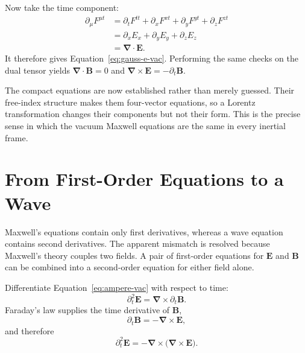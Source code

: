 Now take the time component:
\begin{align}
\partial_\mu F^{\mu t}
&=\partial_tF^{tt}
  +\partial_xF^{xt}
  +\partial_yF^{yt}
  +\partial_zF^{zt}\\
&=\partial_xE_x+\partial_yE_y+\partial_zE_z\\
&=\boldsymbol\nabla\cdot\mathbf E.
\end{align}
It therefore gives Equation~\eqref{eq:gauss-e-vac}. Performing the same checks on the dual tensor yields
\(\boldsymbol\nabla\cdot\mathbf B=0\) and
\(\boldsymbol\nabla\times\mathbf E=-\partial_t\mathbf B\).

The compact equations are now established rather than merely guessed. Their free-index structure makes them four-vector equations, so a Lorentz transformation changes their components but not their form. This is the precise sense in which the vacuum Maxwell equations are the same in every inertial frame.

\section{From First-Order Equations to a Wave}

Maxwell's equations contain only first derivatives, whereas a wave equation contains second derivatives. The apparent mismatch is resolved because Maxwell's theory couples two fields. A pair of first-order equations for \(\mathbf E\) and \(\mathbf B\) can be combined into a second-order equation for either field alone.

Differentiate Equation~\eqref{eq:ampere-vac} with respect to time:
\begin{equation}
\partial_t^2\mathbf E
=\boldsymbol\nabla\times\partial_t\mathbf B.
\end{equation}
Faraday's law supplies the time derivative of \(\mathbf B\),
\begin{equation}
\partial_t\mathbf B=-\boldsymbol\nabla\times\mathbf E,
\end{equation}
and therefore
\begin{equation}
\partial_t^2\mathbf E
=-\boldsymbol\nabla\times
  \bigl(\boldsymbol\nabla\times\mathbf E\bigr).
\label{eq:double-curl}
\end{equation}

